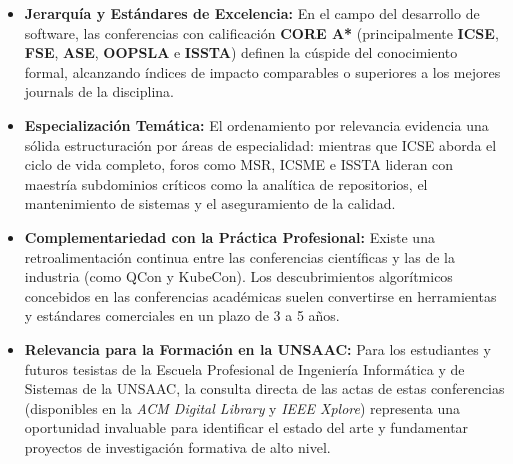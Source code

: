 \documentclass[12pt,a4paper]{article}
\begin{document}
\begin{itemize}[leftmargin=*]
    \item \textbf{Jerarquía y Estándares de Excelencia:} En el campo del desarrollo de software, las conferencias con calificación \textbf{CORE A*} (principalmente \textbf{ICSE}, \textbf{FSE}, \textbf{ASE}, \textbf{OOPSLA} e \textbf{ISSTA}) definen la cúspide del conocimiento formal, alcanzando índices de impacto comparables o superiores a los mejores journals de la disciplina.
    \item \textbf{Especialización Temática:} El ordenamiento por relevancia evidencia una sólida estructuración por áreas de especialidad: mientras que ICSE aborda el ciclo de vida completo, foros como MSR, ICSME e ISSTA lideran con maestría subdominios críticos como la analítica de repositorios, el mantenimiento de sistemas y el aseguramiento de la calidad.
    \item \textbf{Complementariedad con la Práctica Profesional:} Existe una retroalimentación continua entre las conferencias científicas y las de la industria (como QCon y KubeCon). Los descubrimientos algorítmicos concebidos en las conferencias académicas suelen convertirse en herramientas y estándares comerciales en un plazo de 3 a 5 años.
    \item \textbf{Relevancia para la Formación en la UNSAAC:} Para los estudiantes y futuros tesistas de la Escuela Profesional de Ingeniería Informática y de Sistemas de la UNSAAC, la consulta directa de las actas de estas conferencias (disponibles en la \textit{ACM Digital Library} y \textit{IEEE Xplore}) representa una oportunidad invaluable para identificar el estado del arte y fundamentar proyectos de investigación formativa de alto nivel.
\end{itemize}
\end{document}
